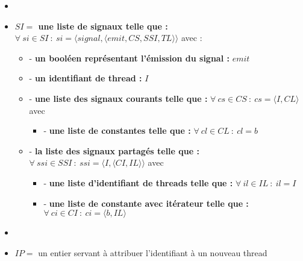 \documentclass[10pt,a4paper]{report}
\begin{document}
\begin{itemize}
\item[]
\item[] \textbf{$SI =$ une liste de signaux telle que :} $\forall~si \in SI~:~si = \langle signal,\langle emit,CS,SSI,TL\rangle\rangle$ avec :
  \begin{itemize}
  \item[] - \textbf{un booléen représentant l'émission du signal :} $emit$
  \item[] - \textbf{un identifiant de thread :} $I$
  \item[] - \textbf{une liste des signaux courants telle que :} $\forall~cs \in CS~:~cs = \langle I,CL\rangle$ avec 
    \begin{itemize}
    \item[] - \textbf{une liste de constantes telle que :} $\forall~cl \in CL~:~cl = b$
    \end{itemize}
    
  \item[] - \textbf{la liste des signaux partagés telle que :} $\forall~ssi \in SSI~:~ssi = \langle I,\langle CI,IL\rangle\rangle$ avec 
    \begin{itemize}
    \item[] - \textbf{une liste d'identifiant de threads telle que :} $\forall~il \in IL~:~il = I$
    \item[] - \textbf{une liste de constante avec itérateur telle que :} $\forall~ci \in CI~:~ci = \langle b, IL\rangle$
    \end{itemize}
  \end{itemize}
\item[]
\item[] $IP =$ un entier servant à attribuer l'identifiant à un nouveau thread 
\end{itemize}
\bigbreak
\end{document}

